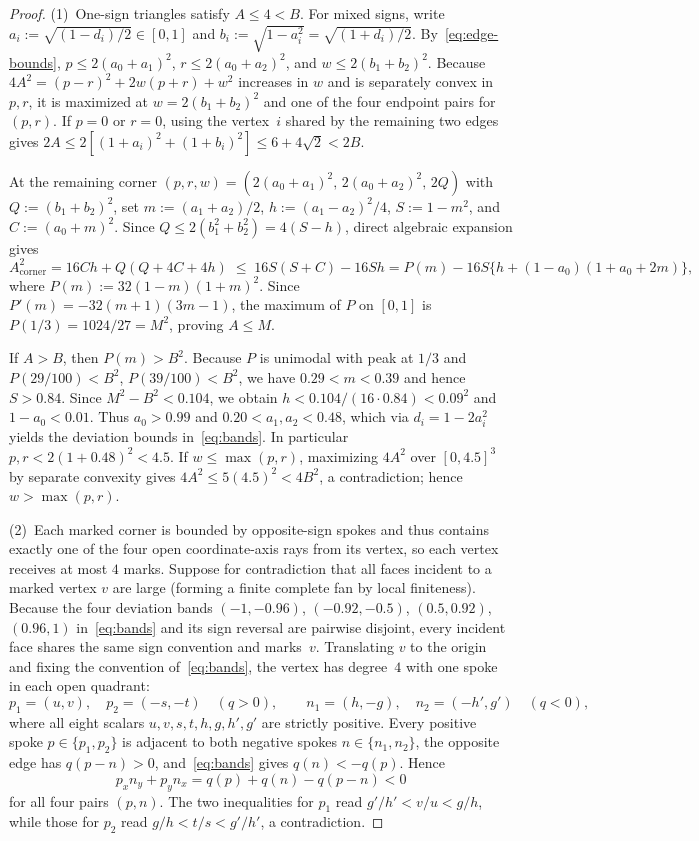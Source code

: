 \documentclass[11pt]{article}
\theoremstyle{plain}
\theoremstyle{definition}
\theoremstyle{remark}
\begin{document}
\begin{proof}
(1)~One-sign triangles satisfy $A \le 4 < B$.
For mixed signs, write $a_i := \sqrt{(1 - d_i)/2} \in [0,1]$ and $b_i := \sqrt{1 - a_i^2} = \sqrt{(1 + d_i)/2}$.
By~\eqref{eq:edge-bounds}, $p \le 2(a_0 + a_1)^2$, $r \le 2(a_0 + a_2)^2$, and $w \le 2(b_1 + b_2)^2$.
Because $4A^2 = (p-r)^2 + 2w(p+r) + w^2$ increases in $w$ and is separately convex in $p, r$, it is maximized at $w = 2(b_1+b_2)^2$ and one of the four endpoint pairs for $(p,r)$.
If $p = 0$ or $r = 0$, using the vertex~$i$ shared by the remaining two edges gives $2A \le 2[(1+a_i)^2 + (1+b_i)^2] \le 6 + 4\sqrt{2} < 2B$.

At the remaining corner $(p,r,w) = (2(a_0+a_1)^2,\, 2(a_0+a_2)^2,\, 2Q)$ with $Q := (b_1+b_2)^2$, set $m := (a_1+a_2)/2$, $h := (a_1-a_2)^2/4$, $S := 1 - m^2$, and $C := (a_0+m)^2$.
Since $Q \le 2(b_1^2 + b_2^2) = 4(S - h)$, direct algebraic expansion gives
\[
A_{\mathrm{corner}}^2 = 16Ch + Q(Q + 4C + 4h)
\;\le\; 16S(S + C) - 16Sh
= P(m) - 16S\bigl\{h + (1 - a_0)(1 + a_0 + 2m)\bigr\},
\]
where $P(m) := 32(1-m)(1+m)^2$.
Since $P'(m) = -32(m+1)(3m-1)$, the maximum of $P$ on $[0,1]$ is $P(1/3) = 1024/27 = M^2$, proving $A \le M$.

If $A > B$, then $P(m) > B^2$.
Because $P$ is unimodal with peak at $1/3$ and $P(29/100) < B^2$, $P(39/100) < B^2$, we have $0.29 < m < 0.39$ and hence $S > 0.84$.
Since $M^2 - B^2 < 0.104$, we obtain $h < 0.104/(16 \cdot 0.84) < 0.09^2$ and $1 - a_0 < 0.01$.
Thus $a_0 > 0.99$ and $0.20 < a_1, a_2 < 0.48$, which via $d_i = 1 - 2a_i^2$ yields the deviation bounds in~\eqref{eq:bands}.
In particular $p, r < 2(1 + 0.48)^2 < 4.5$.
If $w \le \max(p, r)$, maximizing $4A^2$ over $[0, 4.5]^3$ by separate convexity gives $4A^2 \le 5(4.5)^2 < 4B^2$, a contradiction; hence $w > \max(p, r)$.

(2)~Each marked corner is bounded by opposite-sign spokes and thus contains exactly one of the four open coordinate-axis rays from its vertex, so each vertex receives at most $4$ marks.
Suppose for contradiction that all faces incident to a marked vertex $v$ are large (forming a finite complete fan by local finiteness).
Because the four deviation bands $(-1, -0.96)$, $(-0.92, -0.5)$, $(0.5, 0.92)$, $(0.96, 1)$ in~\eqref{eq:bands} and its sign reversal are pairwise disjoint, every incident face shares the same sign convention and marks~$v$.
Translating $v$ to the origin and fixing the convention of~\eqref{eq:bands}, the vertex has degree~$4$ with one spoke in each open quadrant:
\[
p_1 = (u, v), \quad p_2 = (-s, -t) \quad (q > 0), \qquad
n_1 = (h, -g), \quad n_2 = (-h', g') \quad (q < 0),
\]
where all eight scalars $u, v, s, t, h, g, h', g'$ are strictly positive.
Every positive spoke $p \in \{p_1, p_2\}$ is adjacent to both negative spokes $n \in \{n_1, n_2\}$, the opposite edge has $q(p - n) > 0$, and~\eqref{eq:bands} gives $q(n) < -q(p)$. Hence
\[
p_x n_y + p_y n_x = q(p) + q(n) - q(p - n) < 0
\]
for all four pairs $(p, n)$.
The two inequalities for $p_1$ read $g'/h' < v/u < g/h$, while those for $p_2$ read $g/h < t/s < g'/h'$, a contradiction.
\end{proof}
\end{document}
